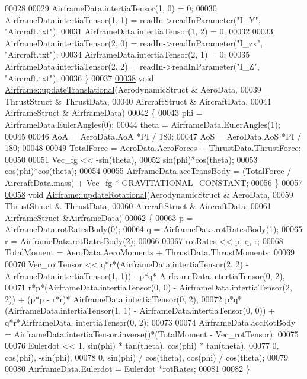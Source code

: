 \begin{DoxyCode}
00028 
00029     AirframeData.intertiaTensor(1, 0) = 0;
00030     AirframeData.intertiaTensor(1, 1) = readIn->readInParameter(\textcolor{stringliteral}{"I\_Y"}, \textcolor{stringliteral}{"Aircraft.txt"});
00031     AirframeData.intertiaTensor(1, 2) = 0;
00032 
00033     AirframeData.intertiaTensor(2, 0) = readIn->readInParameter(\textcolor{stringliteral}{"I\_zx"}, \textcolor{stringliteral}{"Aircraft.txt"});
00034     AirframeData.intertiaTensor(2, 1) = 0;
00035     AirframeData.intertiaTensor(2, 2) = readIn->readInParameter(\textcolor{stringliteral}{"I\_Z"}, \textcolor{stringliteral}{"Aircraft.txt"});
00036 \}
00037 
\hyperlink{group___airframe_ab3e18bd40fd5e68d793a164654a2821a}{00038} \textcolor{keywordtype}{void} \hyperlink{group___airframe_ab3e18bd40fd5e68d793a164654a2821a}{Airframe::updateTranslational}(AerodynamicStruct & AeroData, 
00039                                    ThrustStruct & ThrustData, 
00040                                     AircraftStruct & AircraftData, 
00041                                     AirframeStruct & AirframeData)
00042 \{
00043     phi     = AirframeData.EulerAngles(0);
00044     theta   = AirframeData.EulerAngles(1);
00045 
00046     AoA = AeroData.AoA *PI / 180;
00047     AoS = AeroData.AoS *PI / 180;
00048 
00049     TotalForce = AeroData.AeroForces + ThrustData.ThrustForce;
00050 
00051     Vec\_fg << -sin(theta),
00052             sin(phi)*cos(theta);
00053             cos(phi)*cos(theta);
00054 
00055     AirframeData.accTransBody = (TotalForce / AircraftData.mass) + Vec\_fg  * GRAVITATIONAL\_CONSTANT;
00056 \}
00057 
\hyperlink{group___airframe_af506bca34fa40f9ec0613b3be8f726eb}{00058} \textcolor{keywordtype}{void} \hyperlink{group___airframe_af506bca34fa40f9ec0613b3be8f726eb}{Airframe::updateRotational}(AerodynamicStruct & AeroData, 
00059                                 ThrustStruct & ThrustData, 
00060                                 AircraftStruct & AircraftData,
00061                                 AirframeStruct &AirframeData)
00062 \{
00063     p = AirframeData.rotRatesBody(0);
00064     q = AirframeData.rotRatesBody(1);
00065     r = AirframeData.rotRatesBody(2);
00066 
00067     rotRates << p, q, r;
00068     TotalMoment = AeroData.AeroMoments + ThrustData.ThrustMoments;
00069 
00070     Vec\_rotTensor << q*r*(AirframeData.intertiaTensor(2, 2) - AirframeData.intertiaTensor(1, 1)) - p*q*
      AirframeData.intertiaTensor(0, 2),
00071         r*p*(AirframeData.intertiaTensor(0, 0) - AirframeData.intertiaTensor(2, 2)) + (p*p - r*r)*
      AirframeData.intertiaTensor(0, 2),
00072         p*q*(AirframeData.intertiaTensor(1, 1) - AirframeData.intertiaTensor(0, 0)) + q*r*AirframeData.
      intertiaTensor(0, 2);
00073 
00074     AirframeData.accRotBody = AirframeData.intertiaTensor.inverse()*(TotalMoment - Vec\_rotTensor);
00075 
00076     Eulerdot << 1, sin(phi) * tan(theta), cos(phi) * tan(theta),
00077                 0, cos(phi), -sin(phi),
00078                 0, sin(phi) / cos(theta), cos(phi) / cos(theta);
00079 
00080     AirframeData.Eulerdot = Eulerdot *rotRates;
00081 
00082 \}
\end{DoxyCode}
